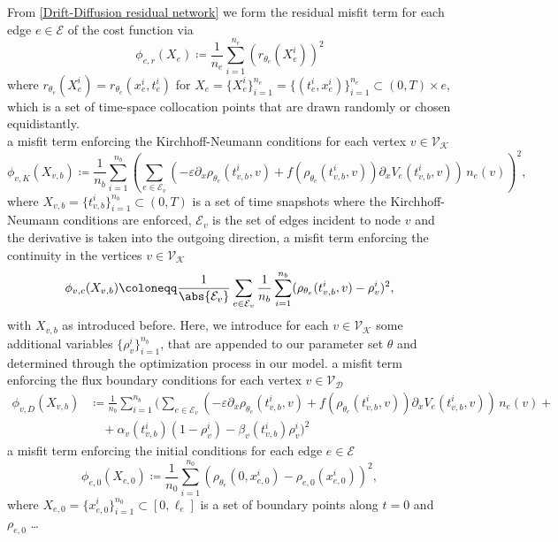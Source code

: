 From \cref{Drift-Diffusion residual network} we form the residual misfit term for each edge $e \in \mathcal{E}$ of the cost function via
\begin{equation*} 
    \phi_{e,r} (X_e) \coloneqq \frac{1}{n_e} \sum_{i=1}^{n_e} (r_{\theta_e} (X_e^i))^2
\end{equation*} 
where $r_{\theta_e} (X_e^i) = r_{\theta_e} (x_e^i, t_e^i)$ for $X_e = \{X_e^i\}_{i=1}^{n_e} = \{(t_e^i, x_e^i)\}_{i=1}^{n_e} \subset (0, T) \times e$, which is a set of time-space collocation points that are drawn randomly or chosen equidistantly. \\
a misfit term enforcing the Kirchhoff-Neumann conditions for each vertex $v \in \mathcal{V}_\mathcal{K}$ 
\begin{equation*} 
    \phi_{v,K} (X_{v,b}) \coloneqq \frac{1}{n_b} \sum_{i=1}^{n_b} (\sum_{e \in \mathcal{E}_v} (- \varepsilon \partial_x \rho_{\theta_e} (t_{v,b}^i, v) + f(\rho_{\theta_e} (t_{v,b}^i, v)) \partial_x V_e(t_{v,b}^i, v)) \, n_e (v))^2, 
\end{equation*} 
where $X_{v,b} = \{t_{v,b}^i\}_{i=1}^{n_b} \subset (0,T)$ is a set of time snapshots where the Kirchhoff-Neumann conditions are enforced, $\mathcal{E}_v$ is the set of edges incident to node $v$ and the derivative is taken into the outgoing direction,
a misfit term enforcing the continuity in the vertices $v \in \mathcal{V}_\mathcal{K}$ 
\begin{equation*} 
    \phi_{v,c} (X_{v,b}) \coloneqq \frac{1}{\abs{\mathcal{E}_v}} \sum_{e \in \mathcal{E}_v} \frac{1}{n_b} \sum_{i=1}^{n_b} ( \rho_{\theta_e} (t_{v,b}^i, v) - \rho_{v}^i)^2,
\end{equation*} 
with $X_{v,b}$ as introduced before. Here, we introduce for each $v \in \mathcal{V}_\mathcal{K}$ some additional variables $\{\rho_{v}^i\}_{i=1}^{n_b}$, that are appended to our parameter set $\theta$ and determined through the optimization process in our model.
a misfit term enforcing the flux boundary conditions for each vertex $v \in \mathcal{V}_\mathcal{D}$ 
\begin{align*} 
    \phi_{v,D} (X_{v,b}) & \coloneqq \frac{1}{n_b} \sum_{i=1}^{n_b} ( \sum_{e\in \mathcal{E}_v} (-\varepsilon \partial_x \rho_{\theta_e} (t_{v,b}^i, v) + f(\rho_{\theta_e} (t_{v,b}^i, v)) \partial_x V_e(t_{v,b}^i, v)) \, n_e (v) + \\ & \quad + \alpha_v(t_{v,b}^i) (1-\rho_v^i) - \beta_v(t_{v,b}^i) \rho_v^i)^2 
\end{align*}
a misfit term enforcing the initial conditions for each edge $e \in \mathcal{E}$ 
\begin{equation*} 
    \phi_{e,0} (X_{e,0}) \coloneqq \frac{1}{n_0} \sum_{i=1}^{n_0} (\rho_{\theta_e} (0,x_{e,0}^i) - \rho_{e,0}(x_{e,0}^i))^2, 
\end{equation*} 
where $X_{e,0} = \{x_{e,0}^i\}_{i=1}^{n_0} \subset [0, \ell_e]$ is a set of boundary points along $t=0$ and $\rho_{e,0}$ \ldots

